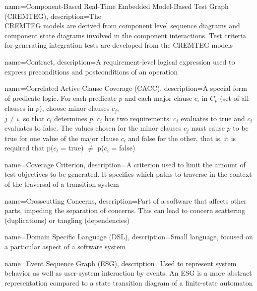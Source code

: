 {
	name={Component-Based Real-Time Embedded Model-Based Test Graph (CREMTEG)},
	description={The \\CREMTEG models are derived from component level sequence diagrams and component state diagrams involved in the component interactions. Test criteria for generating integration tests are developed from the CREMTEG models \cite{Guan2015}}
}

{
	name={Contract},
	description={A requirement-level logical expression used to express preconditions and postconditions of an operation \cite{ClementineNebut2006}}
}

{
	name={Correlated Active Clause Coverage (CACC)},
	description={A special form of predicate logic. For each predicate $p$ and each major clause $c_i$  in $C_p$ (set of all clauses in $p$), choose minor clauses $c_j$,\\ $j \neq i$, so that $c_i$ determines $p$. $c_i$ has two requirements: $c_i$ evaluates to true and $c_i$ evaluates to false. The values chosen for the minor clauses $c_j$ must cause $p$ to be true for one value of the major clause $c_i$ and false for the other, that is, it is required that p($c_i$ = true) $\neq$ p($c_i$ = false) \cite{Ammann2021}}
}

{
	name={Coverage Criterion},
	description={A criterion used to limit the amount of test objectives to be generated. It specifies which paths to traverse in the context of the traversal of a transition system \cite{ClementineNebut2006}}
}

{
	name={Crosscutting Concerns},
	description={Part of a software that affects other parts, impeding the separation of concerns. This can lead to concern scattering (duplications) or tangling (dependencies) \cite{Metsa}}
}

{
	name={Domain Specific Language (DSL)},
	description={Small language, focused on a particular aspect of a software system \cite{Fowler2010}}
}

{
	name={Event Sequence Graph (ESG)},
	description={Used to represent system behavior as well as user-system interaction by events. An ESG is a more abstract representation compared to a state transition diagram of a finite-state automaton \cite{Belli2009}}
}

